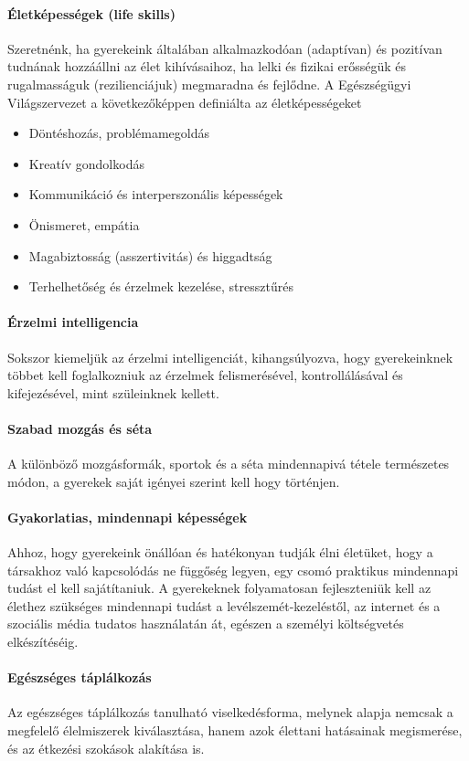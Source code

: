 \paragraph{Életképességek (life skills)}

Szeretnénk, ha gyerekeink általában alkalmazkodóan (adaptívan) és pozitívan
tudnának hozzáállni az élet kihívásaihoz, ha lelki és fizikai erősségük és
rugalmasságuk (rezilienciájuk) megmaradna és fejlődne.	 A Egészségügyi
Világszervezet \citep{oecd99lifeskills} a következőképpen definiálta  az
életképességeket
\begin{itemize}
  \item Döntéshozás, problémamegoldás

  \item Kreatív gondolkodás

  \item Kommunikáció és interperszonális képességek

  \item Önismeret, empátia

  \item Magabiztosság (asszertivitás) és higgadtság

  \item Terhelhetőség és érzelmek kezelése, stressztűrés
\end{itemize}
\paragraph{Érzelmi intelligencia}

Sokszor kiemeljük az érzelmi intelligenciát, kihangsúlyozva, hogy gyerekeinknek
többet kell foglalkozniuk az érzelmek felismerésével, kontrollálásával és
kifejezésével, mint szüleinknek kellett.

\paragraph{Szabad mozgás és séta}

A különböző mozgásformák, sportok és a séta mindennapivá tétele természetes
módon, a gyerekek saját igényei szerint kell hogy történjen.

\paragraph{Gyakorlatias, mindennapi képességek}

Ahhoz, hogy gyerekeink önállóan és hatékonyan tudják élni életüket, hogy a
társakhoz való kapcsolódás ne függőség legyen, egy csomó praktikus mindennapi
tudást el kell sajátítaniuk. A gyerekeknek folyamatosan fejleszteniük kell az
élethez szükséges mindennapi tudást a levélszemét-kezeléstől, az internet és a szociális média
tudatos használatán át, egészen a személyi költségvetés elkészítéséig.

\paragraph{Egészséges táplálkozás}

Az egészséges táplálkozás tanulható viselkedésforma, melynek alapja nemcsak
a megfelelő élelmiszerek kiválasztása, hanem azok élettani hatásainak
megismerése, és az étkezési szokások alakítása is.


